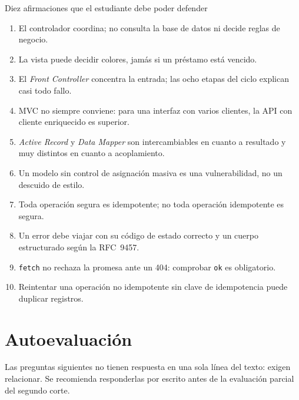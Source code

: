 \documentclass[11pt,a4paper,openany]{book}
\begin{document}
\begin{cajadefinicion}{Diez afirmaciones que el estudiante debe poder defender}
	\begin{enumerate}
		\item El controlador coordina; no consulta la base de datos ni decide reglas de negocio.
		\item La vista puede decidir colores, jamás si un préstamo está vencido.
		\item El \emph{Front Controller} concentra la entrada; las ocho etapas del ciclo explican casi todo fallo.
		\item MVC no siempre conviene: para una interfaz con varios clientes, la API con cliente enriquecido es superior.
		\item \emph{Active Record} y \emph{Data Mapper} son intercambiables en cuanto a resultado y muy distintos en cuanto a acoplamiento.
		\item Un modelo sin control de asignación masiva es una vulnerabilidad, no un descuido de estilo.
		\item Toda operación segura es idempotente; no toda operación idempotente es segura.
		\item Un error debe viajar con su código de estado correcto y un cuerpo estructurado según la RFC~9457.
		\item \texttt{fetch} no rechaza la promesa ante un 404: comprobar \texttt{ok} es obligatorio.
		\item Reintentar una operación no idempotente sin clave de idempotencia puede duplicar registros.
	\end{enumerate}
\end{cajadefinicion}

\section*{Autoevaluación}

Las preguntas siguientes no tienen respuesta en una sola línea del texto: exigen relacionar. Se recomienda responderlas por escrito antes de la evaluación parcial del segundo corte.
\end{document}
